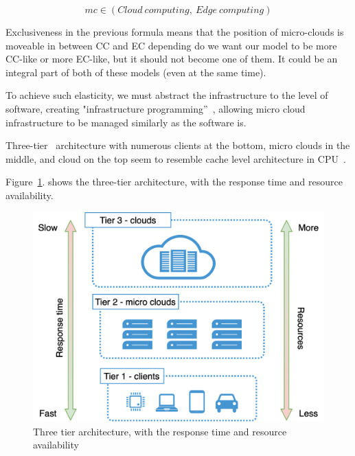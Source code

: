 \begin{equation}
mc \in \left( Cloud\ computing,\ Edge\ computing \right)
\end{equation}

\noindent
Exclusiveness in the previous formula means that the position of micro-clouds is moveable in between CC and EC depending do we want our model to be more CC-like or more EC-like, but it should not become one of them. It could be an integral part of both of these models (even at the same time).

To achieve such elasticity, we must abstract the infrastructure to the level of software, creating "infrastructure programming”~\cite{Fitzgerald}, allowing micro cloud infrastructure to be managed similarly as the software is.

Three-tier~\label{lab:three-tier} architecture with numerous clients at the bottom, micro clouds in the middle, and cloud on the top seem to resemble cache level architecture in CPU~\cite{FarshinRMK19}. 

Figure~\ref{fig:fig9}. shows the three-tier architecture, with the response time and resource availability.

\begin{figure}[H]
	\begin{center}
		\includegraphics{images/Figure9}
	\end{center}
	\vspace{-0.5cm}
	\caption{Three tier architecture, with the response time and resource availability}
	\label{fig:fig9}
\end{figure}

